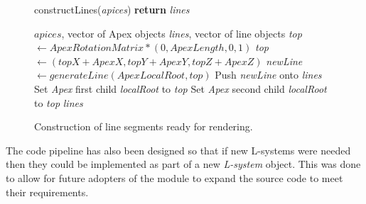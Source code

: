 \documentclass[final]{cmpreport}
\begin{document}
\begin{figure}[ht]
    \begin{algorithm}[H]
    \caption{constructLines(\emph{apices}) {\textbf{return}} \emph{lines}}
        \begin{algorithmic}[1]
        \Require $apices$, vector of Apex objects
        \Ensure \emph{lines}, vector of line objects
            \State \emph{top} $\leftarrow ApexRotationMatrix * (0, ApexLength, 0, 1)$ 
            \State \emph{top} $\leftarrow (topX + ApexX, topY + ApexY, topZ + ApexZ)$ 
            \State \emph{newLine} $\leftarrow generateLine(ApexLocalRoot, top)$ 
            \State Push \emph{newLine} onto \emph{lines}
                \State Set \emph{Apex} first child \emph{localRoot} to \emph{top}
            \EndIf
                \State Set \emph{Apex} second child \emph{localRoot} to \emph{top}
            \EndIf
        \EndFor
        \State \Return \emph{lines}
        \end{algorithmic}
    \end{algorithm}
    \caption{Construction of line segments ready for rendering.}
    \label{fig:construct-lines}
\end{figure}

The code pipeline has also been designed so that if new L-systems were needed then they could 
be implemented as part of a new \emph{L-system} object. This was done to allow for future 
adopters of the module to expand the source code to meet their requirements.
\end{document}
